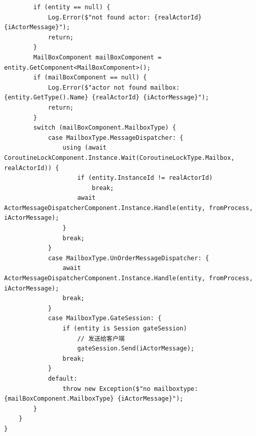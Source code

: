 \documentclass[9pt, b5paper]{article}
\begin{document}
\begin{itemize}
\begin{verbatim}
        if (entity == null) {
            Log.Error($"not found actor: {realActorId} {iActorMessage}");
            return;
        }
        MailBoxComponent mailBoxComponent = entity.GetComponent<MailBoxComponent>();
        if (mailBoxComponent == null) {
            Log.Error($"actor not found mailbox: {entity.GetType().Name} {realActorId} {iActorMessage}");
            return;
        }
        switch (mailBoxComponent.MailboxType) {
            case MailboxType.MessageDispatcher: {
                using (await CoroutineLockComponent.Instance.Wait(CoroutineLockType.Mailbox, realActorId)) {
                    if (entity.InstanceId != realActorId) 
                        break;
                    await ActorMessageDispatcherComponent.Instance.Handle(entity, fromProcess, iActorMessage);
                }
                break;
            }
            case MailboxType.UnOrderMessageDispatcher: {
                await ActorMessageDispatcherComponent.Instance.Handle(entity, fromProcess, iActorMessage);
                break;
            }
            case MailboxType.GateSession: {
                if (entity is Session gateSession) 
                    // 发送给客户端
                    gateSession.Send(iActorMessage);
                break;
            }
            default:
                throw new Exception($"no mailboxtype: {mailBoxComponent.MailboxType} {iActorMessage}");
        }
    }
}
\end{verbatim}
\end{itemize}
\end{document}
